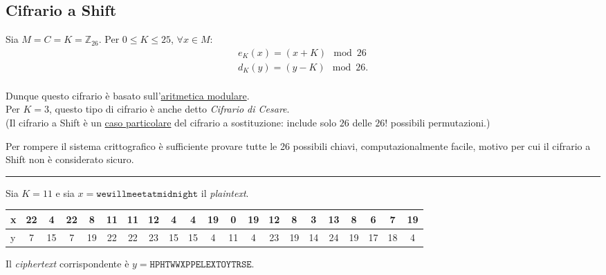 \subsection{Cifrario a Shift}
        Sia $M = C = K = \mathbb{Z}_{26}$. Per $0 \leq K \leq 25$, $ \forall x \in M:$
        \begin{align*}
            e_K(x) = (x + K) \mod 26 \\
            d_K(y) = (y - K) \mod 26. \\
        \end{align*}
    
    \noindent Dunque questo cifrario è basato sull'\underline{aritmetica modulare}. \\     Per $K=3$, questo tipo di cifrario è anche detto \textit{Cifrario di Cesare}. \\ (Il cifrario a Shift è un \underline{caso particolare} del cifrario a sostituzione: include solo $26$ delle $26!$ possibili permutazioni.)
    
    \vspace{1em} \noindent Per rompere il sistema crittografico è sufficiente provare tutte le 26 possibili chiavi, computazionalmente facile, motivo per cui il cifrario a Shift non è considerato sicuro.

    \vspace{1em}
    \hrule
    \begin{example}
        Sia $K = 11$ e sia $x = \texttt{wewillmeetatmidnight}$ il \textit{plaintext}. 

        \vspace{1em}
        \begin{table}[h]
            \begin{tabular}{l| *{20}{c}}
                x & 22 & 4 & 22 & 8 & 11 & 11 & 12 & 4 & 4 & 19 & 0& 19& 12&8&3&13&8&6&7&19 \\
                \hline
                y & 7 & 15 & 7 & 19 & 22 & 22 & 23 & 15 &15 & 4 & 11&4&23&19&14&24&19&17&18&4 
            \end{tabular}

            \vspace{1em}
            Il \textit{ciphertext} corrispondente è $y=\texttt{HPHTWWXPPELEXTOYTRSE}$.
        \end{table}
    \end{example}
    
